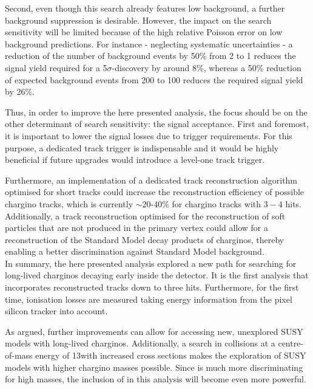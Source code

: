 Second, even though this search already features low background, a further background suppression is desirable.
However, the impact on the search sensitivity will be limited because of the high relative Poisson error on low background predictions.
For instance - neglecting systematic uncertainties - a reduction of the number of background events by 50\% from 2 to 1 reduces the signal yield required for a 5$\sigma$-discovery by around 8\%, whereas a 50\% reduction of expected background events from 200 to 100 reduces the required signal yield by 26\%.

Thus, in order to improve the here presented analysis, the focus should be on the other determinant of search sensitivity: the signal acceptance.
First and foremost, it is important to lower the signal losses due to trigger requirements.
For this purpose, a dedicated track trigger is indispensable and it would be highly beneficial if future upgrades would introduce a level-one track trigger.

Furthermore, an implementation of a dedicated track reconstruction algorithm optimised for short tracks could increase the reconstruction efficiency of possible chargino tracks, which is currently $\sim$20-40\% for chargino tracks with $3-4$ hits.
Additionally, a track reconstruction optimised for the reconstruction of soft particles that are not produced in the primary vertex could allow for a reconstruction of the Standard Model decay products of charginos, thereby enabling a better discrimination against Standard Model background.\\


In summary, the here presented analysis explored a new path for searching for long-lived charginos decaying early inside the detector.
It is the first analysis that incorporates reconstructed tracks down to three hits.
Furthermore, for the first time, ionisation losses are measured taking energy information from the pixel silicon tracker into account.

As argued, further improvements can allow for accessing new, unexplored SUSY models with long-lived charginos.
Additionally, a search in collisions at a centre-of-mass energy of 13\tev with increased cross sections makes the exploration of SUSY models with higher chargino masses possible.
Since \dedx is much more discriminating for high masses, the inclusion of \dedx in this analysis will become even more powerful. 

